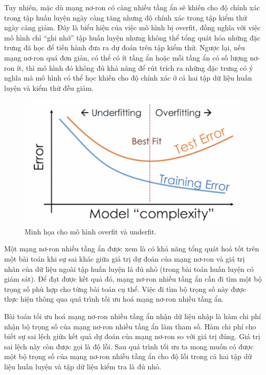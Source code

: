 Tuy nhiên, mặc dù mạng nơ-ron có càng nhiều tầng ẩn sẽ khiến cho độ chính xác trong tập huấn luyện ngày càng tăng nhưng độ chính xác trong tập kiểm thử ngày càng giảm. Đây là biểu hiện của việc mô hình bị overfit, đồng nghĩa với việc mô hình chỉ ``ghi nhớ'' tập huấn luyện nhưng không thể tổng quát hóa những đặc trưng đã học để tiến hành đưa ra dự đoán trên tập kiểm thử. Ngược lại, nếu mạng nơ-ron quá đơn giản, có thể có ít tầng ẩn hoặc mỗi tầng ẩn có số lượng nơ-ron ít, thì mô hình đó không đủ khả năng để rút trích ra những đặc trưng có ý nghĩa mà mô hình có thể học khiến cho độ chính xác ở cả hai tập dữ liệu huấn luyện và kiểm thử đều giảm.

\begin{figure}[htp]
\centering
\includegraphics[width=100 mm]{images/under-over.png}
\caption{Minh họa cho mô hình overfit và underfit. \cite{underoverfit}}
\label{fig:under-over}
\end{figure}

Một mạng nơ-ron nhiều tầng ẩn được xem là có khả năng tổng quát hoá tốt trên một bài toán khi sự sai khác giữa giá trị dự đoán của mạng nơ-ron và giá trị nhãn của dữ liệu ngoài tập huấn luyện là đủ nhỏ (trong bài toán huấn luyện có giám sát). Để đạt được kết quả đó, mạng nơ-ron nhiều tầng ẩn cần đi tìm một bộ trọng số phù hợp cho từng bài toán cụ thể. Việc đi tìm bộ trọng số này được thực hiện thông qua quá trình tối ưu hoá mạng nơ-ron nhiều tầng ẩn.

Bài toán tối ưu hoá mạng nơ-ron nhiều tầng ẩn nhận dữ liệu nhập là hàm chi phí nhận bộ trọng số của mạng nơ-ron nhiều tầng ẩn làm tham số. Hàm chi phí cho biết sự sai lệch giữa kết quả dự đoán của mạng nơ-ron so với giá trị đúng. Giá trị sai lệch này còn được gọi là độ lỗi. Sau quá trình tối ưu ta mong muốn có được một bộ trọng số của mạng nơ-ron nhiều tầng ẩn cho độ lỗi trong cả hai tập dữ liệu huấn luyện và tập dữ liệu kiểm tra là đủ nhỏ.

